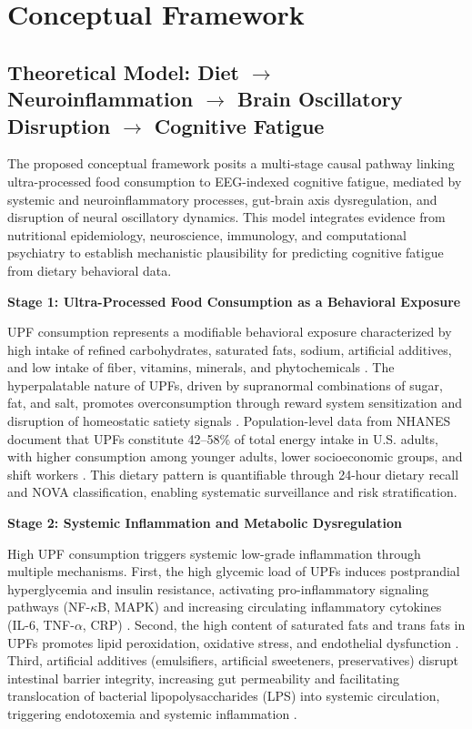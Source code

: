\documentclass[journal,twoside,10pt]{IEEEtran}
\begin{document}
\section{Conceptual Framework}

\subsection{Theoretical Model: Diet $\rightarrow$ Neuroinflammation $\rightarrow$ Brain Oscillatory Disruption $\rightarrow$ Cognitive Fatigue}

The proposed conceptual framework posits a multi-stage causal pathway linking ultra-processed food consumption to EEG-indexed cognitive fatigue, mediated by systemic and neuroinflammatory processes, gut-brain axis dysregulation, and disruption of neural oscillatory dynamics. This model integrates evidence from nutritional epidemiology, neuroscience, immunology, and computational psychiatry to establish mechanistic plausibility for predicting cognitive fatigue from dietary behavioral data.

\textbf{Stage 1: Ultra-Processed Food Consumption as a Behavioral Exposure}

UPF consumption represents a modifiable behavioral exposure characterized by high intake of refined carbohydrates, saturated fats, sodium, artificial additives, and low intake of fiber, vitamins, minerals, and phytochemicals \cite{ref1,ref11,ref46}. The hyperpalatable nature of UPFs, driven by supranormal combinations of sugar, fat, and salt, promotes overconsumption through reward system sensitization and disruption of homeostatic satiety signals \cite{ref4,ref41}. Population-level data from NHANES document that UPFs constitute 42--58\% of total energy intake in U.S. adults, with higher consumption among younger adults, lower socioeconomic groups, and shift workers \cite{ref18,ref49}. This dietary pattern is quantifiable through 24-hour dietary recall and NOVA classification, enabling systematic surveillance and risk stratification.

\textbf{Stage 2: Systemic Inflammation and Metabolic Dysregulation}

High UPF consumption triggers systemic low-grade inflammation through multiple mechanisms. First, the high glycemic load of UPFs induces postprandial hyperglycemia and insulin resistance, activating pro-inflammatory signaling pathways (NF-$\kappa$B, MAPK) and increasing circulating inflammatory cytokines (IL-6, TNF-$\alpha$, CRP) \cite{ref11,ref42}. Second, the high content of saturated fats and trans fats in UPFs promotes lipid peroxidation, oxidative stress, and endothelial dysfunction \cite{ref3,ref17}. Third, artificial additives (emulsifiers, artificial sweeteners, preservatives) disrupt intestinal barrier integrity, increasing gut permeability and facilitating translocation of bacterial lipopolysaccharides (LPS) into systemic circulation, triggering endotoxemia and systemic inflammation \cite{ref37,ref39,ref42}.
\end{document}

